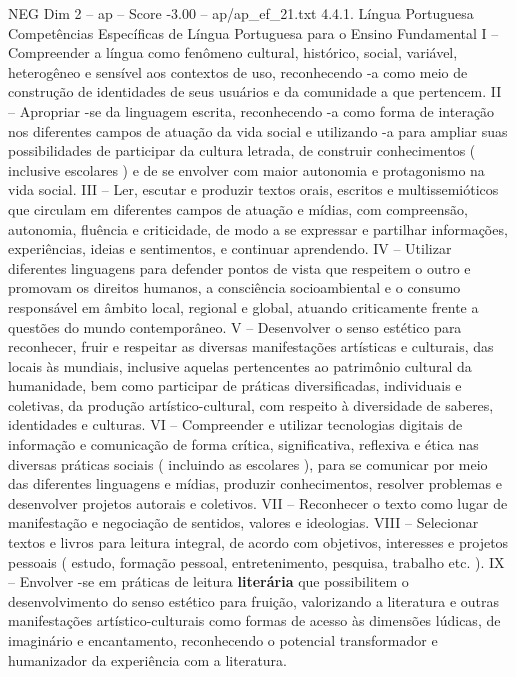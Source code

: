 \begin{textsample}{NEG Dim 2 – ap – Score -3.00 – ap/ap\_ef\_21.txt}  \label{ex:f2_neg_141}
4.4.1.
Língua Portuguesa Competências Específicas de Língua Portuguesa para o Ensino Fundamental I – Compreender a língua como fenômeno cultural, histórico, social, variável, heterogêneo e sensível aos contextos de uso, reconhecendo -a como meio de construção de identidades de seus usuários e da comunidade a que pertencem.
II – Apropriar -se da linguagem escrita, reconhecendo -a como forma de interação nos diferentes campos de atuação da vida social e utilizando -a para ampliar suas possibilidades de participar da cultura letrada, de construir conhecimentos ( inclusive escolares ) e de se envolver com maior autonomia e protagonismo na vida social.
III – Ler, escutar e produzir textos orais, escritos e multissemióticos que circulam em diferentes campos de atuação e mídias, com compreensão, autonomia, fluência e criticidade, de modo a se expressar e partilhar informações, experiências, ideias e sentimentos, e continuar aprendendo.
IV – Utilizar diferentes linguagens para defender pontos de vista que respeitem o outro e promovam os direitos humanos, a consciência socioambiental e o consumo responsável em âmbito local, regional e global, atuando criticamente frente a questões do mundo contemporâneo.
V – Desenvolver o senso estético para reconhecer, fruir e respeitar as diversas manifestações artísticas e culturais, das locais às mundiais, inclusive aquelas pertencentes ao patrimônio cultural da humanidade, bem como participar de práticas diversificadas, individuais e coletivas, da produção artístico-cultural, com respeito à diversidade de saberes, identidades e culturas.
VI – Compreender e utilizar tecnologias digitais de informação e comunicação de forma crítica, significativa, reflexiva e ética nas diversas práticas sociais ( incluindo as escolares ), para se comunicar por meio das diferentes linguagens e mídias, produzir conhecimentos, resolver problemas e desenvolver projetos autorais e coletivos.
VII – Reconhecer o texto como lugar de manifestação e negociação de sentidos, valores e ideologias.
VIII – Selecionar textos e livros para leitura integral, de acordo com objetivos, interesses e projetos pessoais ( estudo, formação pessoal, entretenimento, pesquisa, trabalho etc. ).
IX – Envolver -se em práticas de leitura \textbf{literária} que possibilitem o desenvolvimento do senso estético para fruição, valorizando a literatura e outras manifestações artístico-culturais como formas de acesso às dimensões lúdicas, de imaginário e encantamento, reconhecendo o potencial transformador e humanizador da experiência com a literatura.

\end{textsample}
